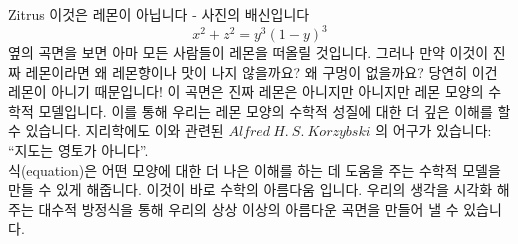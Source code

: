 \begin{surferPage}{Zitrus}
이것은 레몬이 아닙니다 - 사진의 배신입니다\\
\smallskip
\[x^2 + z^2 = y^3 (1 - y)^3\] 
\singlespacing
옆의 곡면을 보면 아마 모든 사람들이 레몬을 떠올릴 것입니다. 그러나 만약 이것이 진짜 레몬이라면 왜 레몬향이나 맛이 나지 않을까요? 왜 구멍이 없을까요? 당연히 이건 레몬이 아니기 때문입니다! 
\singlespacing
이 곡면은 진짜 레몬은 아니지만 아니지만 레몬 모양의 수학적 모델입니다.  이를 통해 우리는 레몬 모양의 수학적 성질에 대한 더 깊은 이해를 할 수 있습니다. 지리학에도 이와 관련된 $Alfred\ H.\ S.\ Korzybski$ 의 어구가 있습니다: \enquote{지도는 영토가 아니다}. \\
\singlespacing
식(equation)은 어떤 모양에 대한 더 나은 이해를 하는 데 도움을 주는 수학적 모델을 만들 수 있게 해줍니다. 
\singlespacing
이것이 바로 수학의 아름다움 입니다. 우리의 생각을 시각화 해주는 대수적 방정식을 통해 우리의 상상 이상의 아름다운 곡면을 만들어 낼 수 있습니다.
\end{surferPage}
